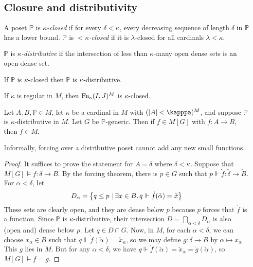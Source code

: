 \subsection{Closure and distributivity}
\begin{definition}
    A poset \( \mathbb P \) is \emph{\( \kappa \)-closed} if for every \( \delta < \kappa \), every decreasing sequence of length \( \delta \) in \( \mathbb P \) has a lower bound.
    \( \mathbb P \) is \emph{\( <\kappa \)-closed} if it is \( \lambda \)-closed for all cardinals \( \lambda < \kappa \).
\end{definition}
\begin{definition}
    \( \mathbb P \) is \emph{\( \kappa \)-distributive} if the intersection of less than \( \kappa \)-many open dense sets is an open dense set.
\end{definition}
\begin{lemma}
    If \( \mathbb P \) is \( \kappa \)-closed then \( \mathbb P \) is \( \kappa \)-distributive.
\end{lemma}
\begin{lemma}
    If \( \kappa \) is regular in \( M \), then \( \operatorname{Fn}_\kappa(I, J)^M \) is \( \kappa \)-closed.
\end{lemma}
\begin{theorem}
    Let \( A, B, \mathbb P \in M \), let \( \kappa \) be a cardinal in \( M \) with \( (\abs{A} < \kapppa)^M \), and suppose \( \mathbb P \) is \( \kappa \)-distributive in \( M \).
    Let \( G \) be \( \mathbb P \)-generic.
    Then if \( f \in M[G] \) with \( f : A \to B \), then \( f \in M \).
\end{theorem}
Informally, forcing over a distributive poset cannot add any new small functions.
\begin{proof}
    It suffices to prove the statement for \( A = \delta \) where \( \delta < \kappa \).
    Suppose that \( M[G] \vDash f : \delta \to B \).
    By the forcing theorem, there is \( p \in G \) such that \( p \Vdash \dot f : \check \delta \to \check B \).
    For \( \alpha < \delta \), let
    \[ D_\alpha = \qty{q \leq p \mid \exists x \in B .\, q \Vdash \dot f(\check \alpha) = \check x} \]
    These sets are clearly open, and they are dense below \( p \) because \( p \) forces that \( \dot f \) is a function.
    Since \( \mathbb P \) is \( \kappa \)-distributive, their intersection \( D = \bigcap_{\alpha < \delta} D_\alpha \) is also (open and) dense below \( p \).
    Let \( q \in D \cap G \).
    Now, in \( M \), for each \( \alpha < \delta \), we can choose \( x_\alpha \in B \) such that \( q \Vdash \dot f(\check \alpha) = \check x_\alpha \), so we may define \( g : \delta \to B \) by \( \alpha \mapsto x_\alpha \).
    This \( g \) lies in \( M \).
    But for any \( \alpha < \delta \), we have \( q \Vdash \dot f(\check \alpha) = \check x_\alpha = \check g(\check \alpha) \), so \( M[G] \vDash f = g \).
\end{proof}
